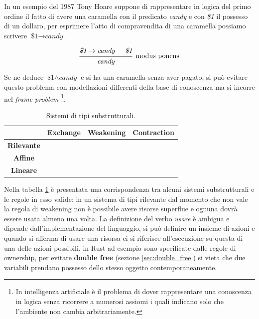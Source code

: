\documentclass[Lau,binding=0.6cm]{sapthesis}
\newcommand{\cmark}{\ding{51}}
\newcommand{\xmark}{\ding{55}}
\begin{document}
In un esempio del 1987 Tony Hoare suppone di rappresentare in logica del primo ordine il fatto di avere una caramella con il predicato \textit{candy} e con  \textit{\$1} il possesso di un dollaro, per esprimere l'atto di compravendita di una caramella possiamo scrivere $ \textit{\$1} \rightarrow \textit{candy} $.

\begin{equation*}
  \begin{prooftree}
    \hypo{\textit{\$1} \rightarrow \textit{candy}}
    \hypo{\textit{\$1}}
    \infer2[modus ponens]{\textit{candy}}
  \end{prooftree}
\end{equation*}

Se ne deduce $ \textit{\$1} \land \textit{candy} $ e si ha una caramella senza aver pagato, si può evitare questo problema con modellazioni differenti della base di conoscenza ma si incorre nel \textit{frame problem} \footnote{In intelligenza artificiale è il problema di dover rappresentare una conoscenza in logica senza ricorrere a numerosi assiomi i quali indicano solo che l'ambiente non cambia arbitrariamente.}. 

\begin{table}[h!t]
    \centering
    \caption{Sistemi di tipi substrutturali.}
    \label{tab:substructural_type_systems}
    \begin{tabular}{c|ccc}
        & \textbf{Exchange} & \textbf{Weakening} & \textbf{Contraction} \\
        \hline
        \textbf{Rilevante} & \cmark & \xmark & \cmark\\
        \textbf{Affine} & \cmark & \cmark & \xmark\\
        \textbf{Lineare} & \cmark & \xmark & \xmark\\
    \end{tabular}
\end{table}

Nella tabella \ref{tab:substructural_type_systems} è presentata una corrispondenza tra alcuni sistemi substrutturali e le regole in esso valide: in un sistema di tipi rilevante dal momento che non vale la regola di weakening non è possibile avere risorse superflue e ognuna dovrà essere usata almeno una volta. 
La definizione del verbo \textit{usare} è ambigua e dipende dall'implementazione del linguaggio, si può definire un insieme di azioni e quando si afferma di usare una risorsa ci si riferisce all'esecuzione su questa di una delle azioni possibili, in Rust ad esempio sono specificate dalle regole di ownership, per evitare \textbf{double free} (sezione \ref{sec:double_free}) si vieta che due variabili prendano possesso dello stesso oggetto contemporaneamente.
\end{document}
